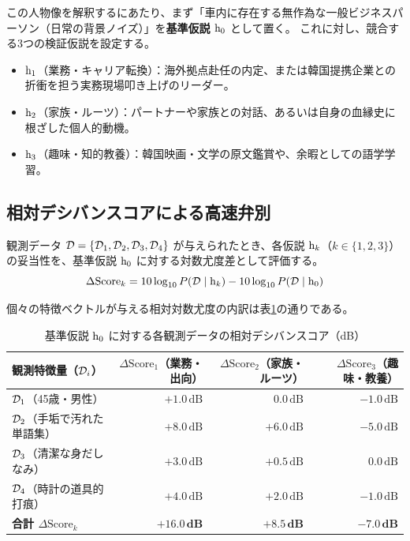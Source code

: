     この人物像を解釈するにあたり、まず「車内に存在する無作為な一般ビジネスパーソン（日常の背景ノイズ）」を\textbf{基準仮説 $\mathrm{h}_0$} として置く。
    これに対し、競合する3つの検証仮説を設定する。
    \begin{itemize}
        \item $\mathrm{h}_1$（業務・キャリア転換）：海外拠点赴任の内定、または韓国提携企業との折衝を担う実務現場叩き上げのリーダー。
        \item $\mathrm{h}_2$（家族・ルーツ）：パートナーや家族との対話、あるいは自身の血縁史に根ざした個人的動機。
        \item $\mathrm{h}_3$（趣味・知的教養）：韓国映画・文学の原文鑑賞や、余暇としての語学学習。
    \end{itemize}

    \subsection{相対デシバンスコアによる高速弁別}

    観測データ $\mathcal{D} = \{\mathcal{D}_1, \mathcal{D}_2, \mathcal{D}_3, \mathcal{D}_4\}$ が与えられたとき、各仮説 $\mathrm{h}_k$（$k \in \{1, 2, 3\}$）の妥当性を、基準仮説 $\mathrm{h}_0$ に対する対数尤度差として評価する。
    \begin{equation}
        \Delta \text{Score}_k = 10 \log_{10} P(\mathcal{D} \mid \mathrm{h}_k) - 10 \log_{10} P(\mathcal{D} \mid \mathrm{h}_0)
    \end{equation}

    個々の特徴ベクトルが与える相対対数尤度の内訳は表\ref{tab:deciban_feature_breakdown}の通りである。

    \begin{table}[htbp]
        \centering
        \caption{基準仮説 $\mathrm{h}_0$ に対する各観測データの相対デシバンスコア（dB）}
        \label{tab:deciban_feature_breakdown}
        \begin{tabular}{lrrr}
            \hline
            観測特徴量（$\mathcal{D}_i$） & $\Delta \text{Score}_1$（業務・出向） & $\Delta \text{Score}_2$（家族・ルーツ） & $\Delta \text{Score}_3$（趣味・教養） \\
            \hline
            $\mathcal{D}_1$（45歳・男性） & $+1.0\,\text{dB}$ & $0.0\,\text{dB}$ & $-1.0\,\text{dB}$ \\
            $\mathcal{D}_2$（手垢で汚れた単語集） & $+8.0\,\text{dB}$ & $+6.0\,\text{dB}$ & $-5.0\,\text{dB}$ \\
            $\mathcal{D}_3$（清潔な身だしなみ） & $+3.0\,\text{dB}$ & $+0.5\,\text{dB}$ & $0.0\,\text{dB}$ \\
            $\mathcal{D}_4$（時計の道具的打痕） & $+4.0\,\text{dB}$ & $+2.0\,\text{dB}$ & $-1.0\,\text{dB}$ \\
            \hline
            \textbf{合計 $\Delta \text{Score}_k$} & $\mathbf{+16.0\,\text{dB}}$ & $\mathbf{+8.5\,\text{dB}}$ & $\mathbf{-7.0\,\text{dB}}$ \\
            \hline
        \end{tabular}
    \end{table}


